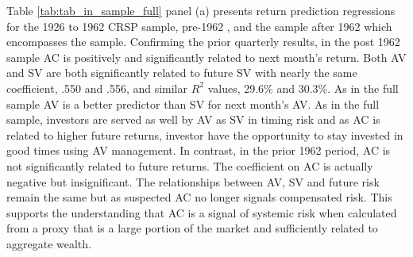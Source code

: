
Table \ref{tab:tab_in_sample_full} panel (a) presents return prediction regressions for the 1926 to 1962 CRSP sample, pre-1962 , and the sample after 1962 which encompasses the \citet{pollet_average_2010} sample. Confirming the prior quarterly results, in the post 1962 sample AC is positively and significantly related to next month's return. Both AV and SV are both significantly related to future SV with nearly the same coefficient, .550 and .556, and similar $R^{2}$ values, 29.6\% and 30.3\%. As in the full sample AV is a better predictor than SV for next month's AV. As in the full sample, investors are served as well by AV as SV in timing risk and as AC is related to higher future returns, investor have the opportunity to stay invested in good times using AV management. In contrast, in the prior 1962 period, AC is not significantly related to future returns. The coefficient on AC is actually negative but insignificant. The relationships between AV, SV and future risk remain the same but as suspected AC no longer signals compensated risk. This supports the understanding that AC is a signal of systemic risk when calculated from a proxy that is a large portion of the market and sufficiently related to aggregate wealth.
